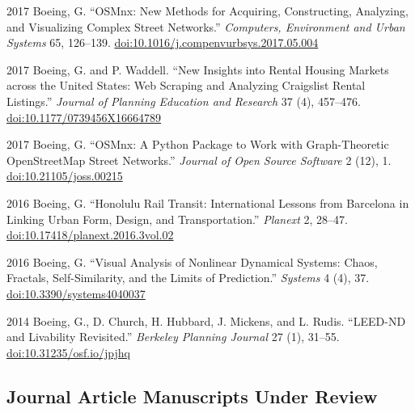 \documentclass[12pt,letterpaper]{report}
\begin{document}
\begin{tablist}
		\item[2017] \tab Boeing, G. \enquote{OSMnx: New Methods for Acquiring, Constructing, Analyzing, and Visualizing Complex Street Networks.} \textit{Computers, Environment and Urban Systems} 65, 126--139. \href{https://doi.org/10.1016/j.compenvurbsys.2017.05.004}{doi:10.1016/j.compenvurbsys.2017.05.004}

		\item[2017] \tab Boeing, G. and P. Waddell. \enquote{New Insights into Rental Housing Markets across the United States: Web Scraping and Analyzing Craigslist Rental Listings.} \textit{Journal of Planning Education and Research} 37 (4), 457--476. \href{https://doi.org/10.1177/0739456X16664789}{doi:10.1177/0739456X16664789}

		\item[2017] \tab Boeing, G. \enquote{OSMnx: A Python Package to Work with Graph-Theoretic OpenStreetMap Street Networks.} \textit{Journal of Open Source Software} 2 (12), 1. \href{https://doi.org/10.21105/joss.00215}{doi:10.21105/joss.00215}

		\item[2016] \tab Boeing, G. \enquote{Honolulu Rail Transit: International Lessons from Barcelona in Linking Urban Form, Design, and Transportation.} \textit{Planext} 2, 28--47. \href{https://doi.org/10.17418/planext.2016.3vol.02}{doi:10.17418/planext.2016.3vol.02}

		\item[2016] \tab Boeing, G. \enquote{Visual Analysis of Nonlinear Dynamical Systems: Chaos, Fractals, Self-Similarity, and the Limits of Prediction.} \textit{Systems} 4 (4), 37. \href{https://doi.org/10.3390/systems4040037}{doi:10.3390/systems4040037}

		\item[2014] \tab Boeing, G., D. Church, H. Hubbard, J. Mickens, and L. Rudis. \enquote{LEED-ND and Livability Revisited.} \textit{Berkeley Planning Journal} 27 (1), 31--55. \href{https://doi.org/10.31235/osf.io/jpjhq}{doi:10.31235/osf.io/jpjhq}

	\end{tablist}



	\subsection*{Journal Article Manuscripts Under Review}
\end{document}
